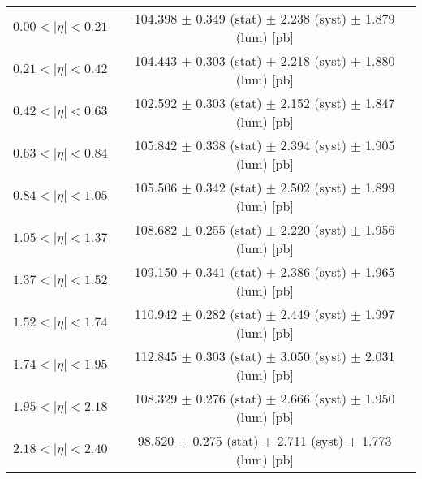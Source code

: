 \begin{tabular}{lc}
\hline
$0.00 < |\eta| <0.21$          & 104.398 $\pm$ 0.349 (stat) $\pm$ 2.238 (syst) $\pm$ 1.879 (lum) [pb]  \\
$0.21 < |\eta| <0.42$          & 104.443 $\pm$ 0.303 (stat) $\pm$ 2.218 (syst) $\pm$ 1.880 (lum) [pb]  \\
$0.42 < |\eta| <0.63$          & 102.592 $\pm$ 0.303 (stat) $\pm$ 2.152 (syst) $\pm$ 1.847 (lum) [pb]  \\
$0.63 < |\eta| <0.84$          & 105.842 $\pm$ 0.338 (stat) $\pm$ 2.394 (syst) $\pm$ 1.905 (lum) [pb]  \\
$0.84 < |\eta| <1.05$          & 105.506 $\pm$ 0.342 (stat) $\pm$ 2.502 (syst) $\pm$ 1.899 (lum) [pb]  \\
$1.05 < |\eta| <1.37$          & 108.682 $\pm$ 0.255 (stat) $\pm$ 2.220 (syst) $\pm$ 1.956 (lum) [pb]  \\
$1.37 < |\eta| <1.52$          & 109.150 $\pm$ 0.341 (stat) $\pm$ 2.386 (syst) $\pm$ 1.965 (lum) [pb]  \\
$1.52 < |\eta| <1.74$          & 110.942 $\pm$ 0.282 (stat) $\pm$ 2.449 (syst) $\pm$ 1.997 (lum) [pb]  \\
$1.74 < |\eta| <1.95$          & 112.845 $\pm$ 0.303 (stat) $\pm$ 3.050 (syst) $\pm$ 2.031 (lum) [pb]  \\
$1.95 < |\eta| <2.18$          & 108.329 $\pm$ 0.276 (stat) $\pm$ 2.666 (syst) $\pm$ 1.950 (lum) [pb]  \\
$2.18 < |\eta| <2.40$          & 98.520 $\pm$ 0.275 (stat) $\pm$ 2.711 (syst) $\pm$ 1.773 (lum) [pb]  \\
\hline
\end{tabular}
